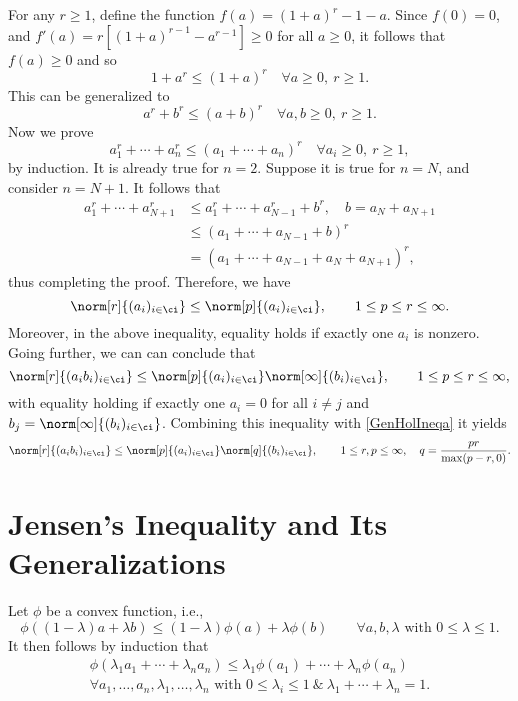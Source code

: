\documentclass[]{amsart}
\begin{document}
For any $r \ge 1$, define the function $f(a)= (1+a)^r -1 - a$.  Since $f(0)=0$, and $f'(a)=r[(1+a)^{r-1}-a^{r-1}]\ge 0$ for all $a\ge 0$, it follows that $f(a)\ge 0$ and so
\[
1 + a^ r \le (1+a)^r \quad \forall a\ge 0, \ r \ge 1.
\] 
This can be generalized to 
\[
a^r + b^ r \le (a+b)^r \quad \forall a,b\ge 0, \ r \ge 1.
\] 
Now we prove
\[
a_1^r + \cdots + a_n^ r \le (a_1 + \cdots + a_n)^r \quad \forall a_i\ge 0, \ r \ge 1,
\] 
by induction.  It is already true for $n=2$.  Suppose it is true for $n=N$, and consider $n=N+1$.  It follows that 
\begin{align*}
a_1^r + \cdots + a_{N+1}^ r &\le a_1^r + \cdots + a_{N-1}^r+b^r, \quad b=a_N+a_{N+1}\\
& \le (a_1 + \cdots + a_{N-1}+b)^r \\
& = (a_1 + \cdots + a_{N-1}+a_N+a_{N+1})^r,
\end{align*} 
thus completing the proof.  Therefore, we have
\begin{equation} \label{OppIneq}
\norm[r]{(a_i)_{i \in \ci}} \le \norm[p]{(a_i)_{i \in \ci}}, \qquad
1 \le p \le r \le \infty.
\end{equation}
Moreover, in the above inequality, equality holds if exactly one $a_i$ is nonzero.  Going further, we can can conclude that
\begin{equation} \label{GenOppIneq}
\norm[r]{(a_ib_i)_{i \in \ci}} \le \norm[p]{(a_i)_{i \in \ci}} \norm[\infty]{(b_i)_{i \in \ci}}, \qquad 1 \le p \le r \le \infty,
\end{equation}
with equality holding if exactly one $a_i=0$ for all $i \ne j$ and $b_j=\norm[\infty]{(b_i)_{i \in \ci}}$. Combining this inequality with \eqref{GenHolIneqa} it yields
\begin{equation}
\norm[r]{(a_ib_i)_{i \in \ci}} \le \norm[p]{(a_i)_{i \in \ci}} \norm[q]{(b_i)_{i \in \ci}}, \qquad
1 \le r, p \le \infty, \quad  q= \frac{pr}{\max(p-r,0)}.
\end{equation}


\section{Jensen's Inequality and Its Generalizations}

Let $\phi$ be a convex function, i.e., 
\begin{equation*}
\phi( (1-\lambda) a + \lambda b) \le (1-\lambda) \phi(a) + \lambda \phi(b) \qquad \forall a,b, \lambda \text{ with } 0 \le \lambda \le 1.
\end{equation*}
It then follows by induction that 
\begin{multline} \label{JensenIneq}
\phi( \lambda_1 a_1 + \cdots + \lambda_n a_n ) \le \lambda_1 \phi(a_1) + \cdots + \lambda_n \phi(a_n) \\ 
\forall a_1, \ldots, a_n,  \lambda_1 , \ldots, \lambda_n \text{ with } 0 \le \lambda_i \le 1 \ \& \ \lambda_1 + \cdots + \lambda_n = 1.
\end{multline}
\end{document}
